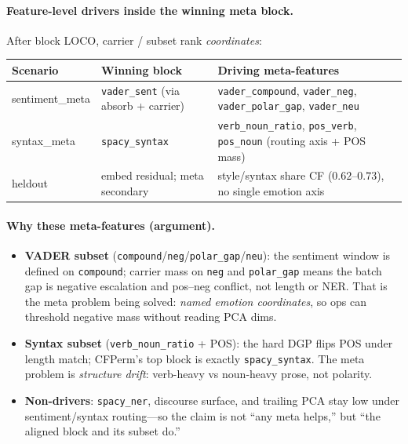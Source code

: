 \documentclass[11pt]{article}
\begin{document}
\paragraph{Feature-level drivers inside the winning meta block.}
After block LOCO, carrier / subset rank \emph{coordinates}:
\begin{center}
\begin{tabular}{lll}
\toprule
Scenario & Winning block & Driving meta-features \\
\midrule
sentiment\_meta & \texttt{vader\_sent}
  (via absorb + carrier) &
  \texttt{vader\_compound}, \texttt{vader\_neg},
  \texttt{vader\_polar\_gap}, \texttt{vader\_neu} \\
syntax\_meta & \texttt{spacy\_syntax} &
  \texttt{verb\_noun\_ratio}, \texttt{pos\_verb}, \texttt{pos\_noun}
  (routing axis + POS mass) \\
heldout & embed residual; meta secondary &
  style/syntax share CF ($0.62$--$0.73$), no single emotion axis \\
\bottomrule
\end{tabular}
\end{center}

\paragraph{Why these meta-features (argument).}
\begin{itemize}[leftmargin=*]
  \item \textbf{VADER subset} (\texttt{compound}/\texttt{neg}/\texttt{polar\_gap}/\texttt{neu}):
        the sentiment window is defined on \texttt{compound}; carrier
        mass on \texttt{neg} and \texttt{polar\_gap} means the batch gap
        is negative escalation and pos--neg conflict, not length or NER.
        That is the meta problem being solved: \emph{named emotion
        coordinates}, so ops can threshold negative mass without reading
        PCA dims.
  \item \textbf{Syntax subset} (\texttt{verb\_noun\_ratio} + POS):
        the hard DGP flips POS under length match; CFPerm's top block is
        exactly \texttt{spacy\_syntax}. The meta problem is
        \emph{structure drift}: verb-heavy vs noun-heavy prose, not
        polarity.
  \item \textbf{Non-drivers}: \texttt{spacy\_ner}, discourse surface, and
        trailing PCA stay low under sentiment/syntax routing---so the
        claim is not ``any meta helps,'' but ``the aligned block and its
        subset do.''
\end{itemize}
\end{document}
